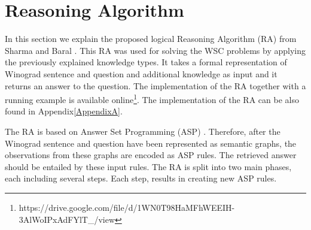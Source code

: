 \section{Reasoning Algorithm}
In this section we explain the proposed logical Reasoning Algorithm (RA) from Sharma and Baral \cite{2018CommonsenseKT}. This RA was used for solving the WSC problems by applying the previously explained knowledge types. It takes a formal representation of Winograd sentence and question and additional knowledge as input and it returns an answer to the question. The implementation of the RA together with a running example is available online\footnote{https://drive.google.com/file/d/1WN0T98HaMFhWEEIH-3AlWoIPxAdFYlT\_/view}. The implementation of the RA  can be also found in Appendix\ref{AppendixA}. 

The RA is based on Answer Set Programming (ASP) \cite{DBLP:conf/aaai/Lifschitz08}. Therefore, after the Winograd sentence and question have been represented as semantic graphs, the observations from these graphs are encoded as ASP rules. The retrieved answer should be entailed by these input rules.
The RA is split into two main phases, each including several steps. Each step, results in creating new ASP rules.
